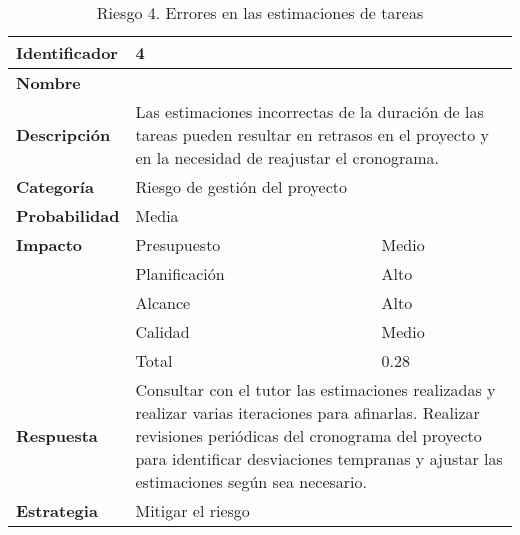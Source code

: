 \begin{table}[H]
    \centering
    \caption{Riesgo 4. Errores en las estimaciones de tareas}
    \label{table:risk_estimaciones}
    \begin{tabular}{>{\columncolor{rowcolor}}l l l}
    \toprule
    \rowcolor{lightgreen}
    \textbf{Identificador} & \multicolumn{2}{l}{4} \\
    \midrule
    \textbf{Nombre} & \multicolumn{2}{l}{} \\
    \midrule
    \textbf{Descripción} & \multicolumn{2}{p{10cm}}{Las estimaciones incorrectas de la duración de las tareas pueden resultar en retrasos en el proyecto y en la necesidad de reajustar el cronograma.} \\
    \midrule
    \textbf{Categoría} & \multicolumn{2}{l}{Riesgo de gestión del proyecto} \\
    \midrule
    \textbf{Probabilidad} & \multicolumn{2}{l}{Media} \\
    \midrule
    \textbf{Impacto} & Presupuesto & Medio \\
    \cmidrule(lr){2-3}
    & Planificación & Alto \\
    \cmidrule(lr){2-3}
    & Alcance & Alto \\
    \cmidrule(lr){2-3}
    & Calidad & Medio \\
    \cmidrule(lr){2-3}
    & Total & 0.28 \\
    \midrule
    \textbf{Respuesta} & \multicolumn{2}{p{10cm}}{Consultar con el tutor las estimaciones realizadas y realizar varias iteraciones para afinarlas. Realizar revisiones periódicas del cronograma del proyecto para identificar desviaciones tempranas y ajustar las estimaciones según sea necesario.} \\
    \midrule
    \textbf{Estrategia} & \multicolumn{2}{l}{Mitigar el riesgo} \\
    \bottomrule
    \end{tabular}
\end{table}

